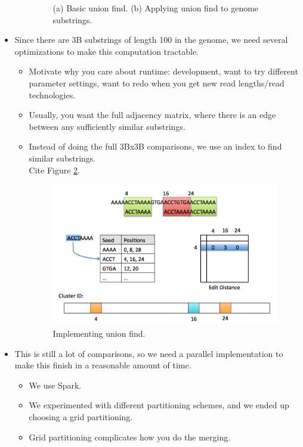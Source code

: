 \documentclass[10pt]{article}
\begin{document}
\begin{itemize}
\begin{itemize}
\begin{figure}
\begin{tabular}{c c}
\end{tabular}
\caption{(a) Basic union find.  (b)  Applying union find to genome substrings.}
\label{fig:unionFind}
\end{figure}
\end{itemize}
\item{Since there are 3B substrings of length 100 in the genome, we need several optimizations to make this computation tractable.}
\begin{itemize}
\item{Motivate why you care about runtime:  development, want to try different parameter settings, want to redo when you get new read lengths/read technologies.}
\item{Usually, you want the full adjacency matrix, where there is an edge between any sufficiently similar substrings.}
\item{Instead of doing the full 3Bx3B comparisons, we use an index to find similar substrings.}\\
Cite Figure \ref{fig:implementingUnionFind}.
\begin{figure}
\centering
\includegraphics[scale=0.4]{implementingUnionFind}
\caption{Implementing union find.}
\label{fig:implementingUnionFind}
\end{figure}
\end{itemize}
\item{This is still a lot of comparisons, so we need a parallel implementation to make this finish in a reasonable amount of time.}
\begin{itemize}
\item{We use Spark.}
\item{We experimented with different partitioning schemes, and we ended up choosing a grid partitioning.}
\item{Grid partitioning complicates how you do the merging.}\\

\end{itemize}
\end{itemize}
\end{document}
